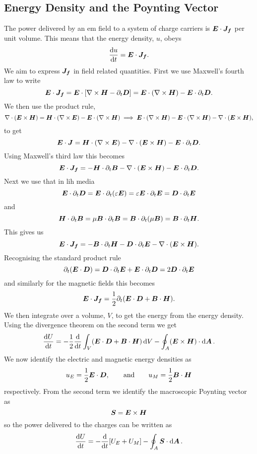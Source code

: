     \subsection{Energy Density and the Poynting Vector}
    The power delivered by an \gls{em} field to a system of charge carriers is \(\bm{E}\cdot\bm{J_f}\) per unit volume.
    This means that the energy density, \(u\), obeys
    \[\dv{u}{t} = \bm{E}\cdot\bm{J_f}.\]
    We aim to express \(\bm{J_f}\) in field related quantities.
    First we use Maxwell's fourth law to write
    \[\bm{E}\cdot\bm{J_f} = \bm{E}\cdot\left[\nabla\times\bm{H} - \partial_t\bm{D}\right] = \bm{E}\cdot(\nabla\times\bm{H}) - \bm{E}\cdot\partial_t\bm{D}.\]
    We then use the product rule,
    \[\nabla\cdot(\bm{E}\times\bm{H}) = \bm{H}\cdot(\nabla\times\bm{E}) - \bm{E}\cdot(\nabla\times\bm{H}) \implies \bm{E}\cdot(\nabla\times\bm{H}) - \bm{E}\cdot(\nabla\times\bm{H}) - \nabla\cdot(\bm{E}\times\bm{H}),\]
    to get
    \[\bm{E}\cdot\bm{J} = \bm{H}\cdot(\nabla\times\bm{E}) - \nabla\cdot(\bm{E}\times\bm{H}) - \bm{E}\cdot\partial_t\bm{D}.\]
    Using Maxwell's third law this becomes
    \[\bm{E}\cdot\bm{J_f} = -\bm{H}\cdot\partial_t\bm{B} - \nabla\cdot(\bm{E}\times\bm{H}) - \bm{E}\cdot\partial_t\bm{D}.\]
    Next we use that in \gls{lih} media
    \[\bm{E}\cdot\partial_t\bm{D} = \bm{E}\cdot\partial_t(\varepsilon\bm{E}) = \varepsilon\bm{E}\cdot\partial_t\bm{E} = \bm{D}\cdot\partial_t\bm{E}\]
    and
    \[\bm{H}\cdot\partial_t\bm{B} = \mu\bm{B}\cdot\partial_t\bm{B} = \bm{B}\cdot\partial_t(\mu\bm{B}) = \bm{B}\cdot\partial_t\bm{H}.\]
    This gives us
    \[\bm{E}\cdot\bm{J_f} = -\bm{B}\cdot\partial_t\bm{H} - \bm{D}\cdot\partial_t\bm{E} - \nabla\cdot(\bm{E}\times\bm{H}).\]
    Recognising the standard product rule
    \[\partial_t(\bm{E} \cdot \bm{D}) = \bm{D}\cdot\partial_t\bm{E} + \bm{E}\cdot\partial_t\bm{D} = 2\bm{D}\cdot\partial_t\bm{E}\]
    and similarly for the magnetic fields this becomes
    \[\bm{E}\cdot\bm{J_f} = \frac{1}{2}\partial_t(\bm{E}\cdot\bm{D} + \bm{B}\cdot\bm{H}).\]
    We then integrate over a volume, \(V\), to get the energy from the energy density.
    Using the divergence theorem on the second term we get
    \[\dv{U}{t} = -\frac{1}{2}\dv{t}\int_V (\bm{E}\cdot\bm{D} + \bm{B}\cdot\bm{H})\dd{V} - \oint_A(\bm{E}\times\bm{H})\cdot\dd{\bm{A}}.\]
    We now identify the electric and magnetic energy densities as
    \[u_E = \frac{1}{2}\bm{E}\cdot\bm{D}, \qquad\text{and}\qquad u_M = \frac{1}{2}\bm{B}\cdot\bm{H}\]
    respectively.
    From the second term we identify the macroscopic Poynting vector as
    \[\bm{S} = \bm{E}\times\bm{H}\]
    so the power delivered to the charges can be written as
    \[\dv{U}{t} = -\dv{t}[U_E + U_M] - \oint_A\bm{S}\cdot\dd{\bm{A}}.\]
    
